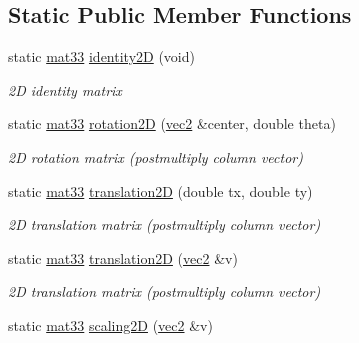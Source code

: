 \subsection*{\-Static \-Public \-Member \-Functions}
\begin{DoxyCompactItemize}
\item 
\hypertarget{classutil_1_1math_1_1mat33_afc887f0aa54e0b159a2c4993a19fdf36}{static \hyperlink{classutil_1_1math_1_1mat33}{mat33} \hyperlink{classutil_1_1math_1_1mat33_afc887f0aa54e0b159a2c4993a19fdf36}{identity2\-D} (void)}\label{classutil_1_1math_1_1mat33_afc887f0aa54e0b159a2c4993a19fdf36}

\begin{DoxyCompactList}\small\item\em 2\-D identity matrix \end{DoxyCompactList}\item 
\hypertarget{classutil_1_1math_1_1mat33_aebca188a2f554b0799dff8f2fc0d72e4}{static \hyperlink{classutil_1_1math_1_1mat33}{mat33} \hyperlink{classutil_1_1math_1_1mat33_aebca188a2f554b0799dff8f2fc0d72e4}{rotation2\-D} (\hyperlink{classutil_1_1math_1_1vec2}{vec2} \&center, double theta)}\label{classutil_1_1math_1_1mat33_aebca188a2f554b0799dff8f2fc0d72e4}

\begin{DoxyCompactList}\small\item\em 2\-D rotation matrix (postmultiply column vector) \end{DoxyCompactList}\item 
\hypertarget{classutil_1_1math_1_1mat33_abf6f4e4217c5c86d1c83ee6e1e25de97}{static \hyperlink{classutil_1_1math_1_1mat33}{mat33} \hyperlink{classutil_1_1math_1_1mat33_abf6f4e4217c5c86d1c83ee6e1e25de97}{translation2\-D} (double tx, double ty)}\label{classutil_1_1math_1_1mat33_abf6f4e4217c5c86d1c83ee6e1e25de97}

\begin{DoxyCompactList}\small\item\em 2\-D translation matrix (postmultiply column vector) \end{DoxyCompactList}\item 
\hypertarget{classutil_1_1math_1_1mat33_ad3aeb80fb940785f461890a1d23ac167}{static \hyperlink{classutil_1_1math_1_1mat33}{mat33} \hyperlink{classutil_1_1math_1_1mat33_ad3aeb80fb940785f461890a1d23ac167}{translation2\-D} (\hyperlink{classutil_1_1math_1_1vec2}{vec2} \&v)}\label{classutil_1_1math_1_1mat33_ad3aeb80fb940785f461890a1d23ac167}

\begin{DoxyCompactList}\small\item\em 2\-D translation matrix (postmultiply column vector) \end{DoxyCompactList}\item 
\hypertarget{classutil_1_1math_1_1mat33_a4990a58195f77910ca48eb940d6f8132}{static \hyperlink{classutil_1_1math_1_1mat33}{mat33} \hyperlink{classutil_1_1math_1_1mat33_a4990a58195f77910ca48eb940d6f8132}{scaling2\-D} (\hyperlink{classutil_1_1math_1_1vec2}{vec2} \&v)}\label{classutil_1_1math_1_1mat33_a4990a58195f77910ca48eb940d6f8132}


\end{DoxyCompactItemize}
